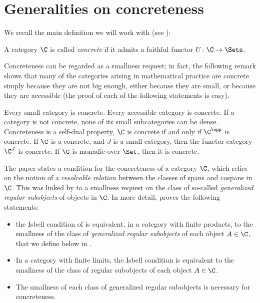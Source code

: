 \section{Generalities on concreteness}
We recall the main definition we will work with (see \cite{Bor1,McL}):
\begin{definition}\label{concrecat} A category $\C$ is called \emph{concrete} if
it admits a faithful functor $U\colon \C \to \Sets$.
\end{definition} Concreteness can be regarded as a smallness request; in fact,
the following remark shows that many of the categories arising in mathematical
practice are concrete simply because they are not big enough, either because
they are small, or because they are accessible (the proof of each of the
following statements is easy).
\begin{remark}\label{all-is-conc} Every small
category is concrete. Every accessible category is concrete. If a category is
not concrete, none of its small subcategories can be dense. Concreteness is a
self-dual property, \ie $\C$ is concrete if and only if $\C^\opp$ is concrete.
If $\C$ is a concrete, and $J$ is a small category, then the functor category
$\C^J$ is concrete. If $\C$ is monadic over $\Set$, then it is concrete.
\end{remark} 
The paper \cite{Isbell1964} states a condition for the concreteness of a category $\C$, which relies on the notion of a \emph{resolvable relation} between the classes of spans and cospans in $\C$. This was linked by \cite{freyd1973concreteness} to a smallness request on the class of so-called \emph{generalized regular subobjects} of objects in $\C$. In more detail, \cite{freyd1973concreteness} proves the following statements:
\begin{itemize}
	\item the Isbell condition of \cite{Isbell1964} is equivalent, in a category with finite products, to the smallness of the class of \emph{generalized regular subobjects} of each object $A\in\C$, that we define below in .
	\item In a category with finite limits, the Isbell condition is equivalent to the smallness of the class of regular subobjects of each object $A\in\C$.
	\item The smallness of each class of generalized regular subobjects is necessary for concreteness.
\end{itemize}
